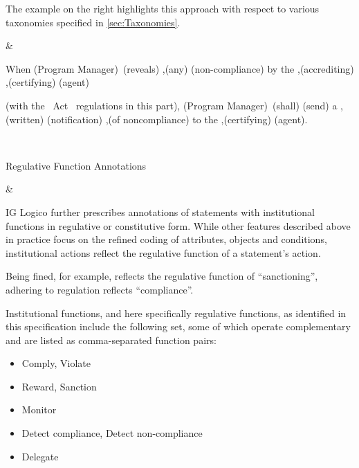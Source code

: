 \begin{landscape}
\begin{longtable}{\tabledims}
The example on the right highlights this approach with respect to various taxonomies specified in \cref{sec:Taxonomies}.

&

\begin{exi}\Cac{}\lb When \lsi \A{}(Program Manager)\rsi~\I{}(reveals) \Bdir{},\prop{}(any) \Bdir{}(non-compliance) \lsi by the \Bind{},(accrediting)  \Bind{},(certifying) \Bind{}(agent)\rsi  

\Cex{}(with the ~Act \lsi \OR{}\rsi~regulations in this part), \lsi \A{}(Program Manager)\rsi~\D{}(shall) \I{}(\lsi send\rsi) a \Bdir{},(written) \Bdir{} (notification) \Bdir{},(of noncompliance) to the  \Bind{},(certifying) \Bind{}(agent).\end{exi}

\\

\midrule

\begin{emp}Regulative Function Annotations\end{emp}

&

IG Logico further prescribes annotations of statements with institutional functions in regulative or constitutive form. While other features described above in practice focus on the refined coding of attributes, objects and conditions, institutional actions reflect the regulative function of a statement's action.

\sp

Being fined, for example, reflects the regulative function of ``sanctioning'', adhering to regulation reflects ``compliance''.

\sp

Institutional functions, and here specifically regulative functions, as identified in this specification include the following set, some of which operate complementary and are listed as comma-separated function pairs: 

\begin{itemize}
\item Comply, Violate
\item Reward, Sanction
\item Monitor
\item Detect compliance, Detect non-compliance
\item Delegate
\end{itemize}


\end{longtable}
\end{landscape}
